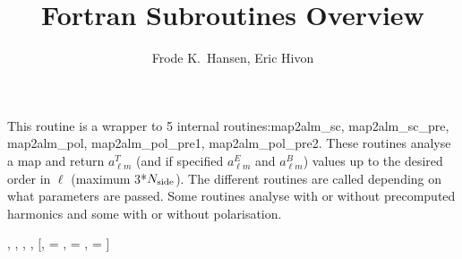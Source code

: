 
\sloppy


\title{\healpix Fortran Subroutines Overview}
 \section[map2alm*]{ }
\label{sub:map2alm}
\author{Frode K.~Hansen, Eric Hivon}

\begin{facility}
{This routine is a wrapper to 5 internal routines:map2alm\_sc,
map2alm\_sc\_pre, map2alm\_pol, map2alm\_pol\_pre1,
map2alm\_pol\_pre2. These routines analyse a  map and return
$a_{\ell m}^T$ (and if specified $a_{\ell m}^E$ and $a_{\ell m}^B$) values up to
the desired order in $\ell$ (maximum 3*$N_{\mathrm{side}}$). The different
routines are called depending on what parameters are passed. Some
routines analyse with or without precomputed harmonics and some with
or without polarisation. }
{\modAlmTools}
\end{facility}

\begin{f90format}
{%
, %
, %
, %
, %
[, =%
, =%
, =%
]}
\end{f90format}

